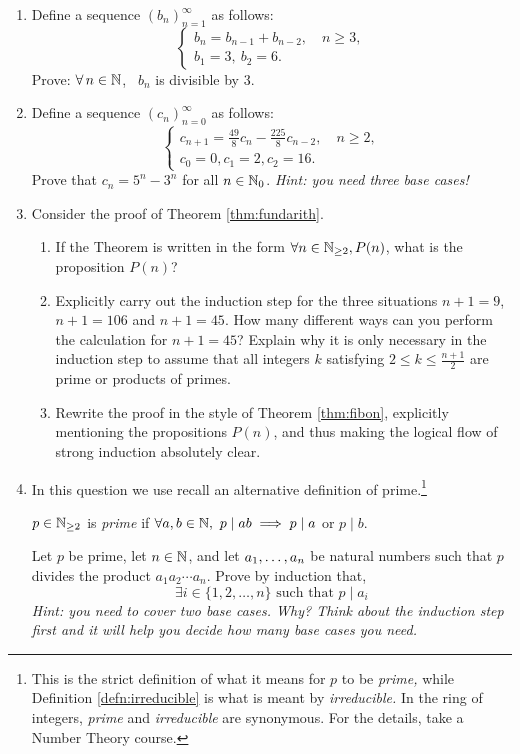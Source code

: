 \begin{exercises}{}{}

\begin{enumerate}
  \item Define a sequence $(b_n)_{n=1}^\infty$ as follows:
  	\[\begin{cases}
			b_n=b_{n-1}+b_{n-2},\quad n\ge 3,\\
			b_1=3,\ b_2=6.
		\end{cases}\]
		Prove: $\forall \,n\in\mathbb{N}$, \ $b_n$ is divisible by 3.
	
	\item\label{ex:ind3} Define a sequence $(c_n)_{n=0}^\infty$ as follows:
	  \[\begin{cases}
			c_{n+1}=\frac{49}8c_n-\frac{225}8c_{n-2},\quad n\ge 2,\\
			c_0=0, c_1=2, c_2=16.
		\end{cases}\]
		Prove that $c_n=5^n-3^n$ for all $n\in\mathbb{N}_0$. \emph{Hint: you need three base cases!}
		
	\item Consider the proof of Theorem \ref{thm:fundarith}.
	\begin{enumerate}
	  \item If the Theorem is written in the form $\forall n\in\mathbb{N}_{\ge 2}, P(n)$, what is the proposition $P(n)$?
	  \item Explicitly carry out the induction step for the three situations $n+1=9$, $n+1=106$ and $n+1=45$. How many different ways can you perform the calculation for $n+1=45$? Explain why it is only necessary in the induction step to assume that all integers $k$ satisfying $2\le k\le\frac{n+1}2$ are prime or products of primes.
	  \item Rewrite the proof in the style of Theorem \ref{thm:fibon}, explicitly mentioning the propositions $P(n)$, and thus making the logical flow of strong induction absolutely clear.
	\end{enumerate}

	\item In this question we use recall an alternative definition of prime.\footnote{This is the strict definition of what it means for $p$ to be \emph{prime,} while Definition \ref{defn:irreducible} is what is meant by \emph{irreducible.} In the ring of integers, \emph{prime} and \emph{irreducible} are synonymous. For the details, take a Number Theory course.}
	\begin{defn*}{}{}
		$p\in\mathbb{N}_{\ge 2}$ is \emph{prime} if $\forall a,b\in\mathbb{N},\ p\mid ab\implies p\mid a$ or $p\mid b$.
	\end{defn*}
	Let $p$ be prime, let $n\in\mathbb{N}$, and let ${a}_1,\ldots,{a}_{n}$ be natural numbers such that $p$ divides the product $a_1a_2\cdots a_n$. Prove by induction that,
	\[
		\exists i\in\{1,2,\ldots,n\}\text{ such that }p\mid a_i
	\]
  \emph{Hint: you need to cover \emph{two} base cases. Why? Think about the induction step first and it will help you decide how many base cases you need.}
	

\end{enumerate}
\end{exercises}
